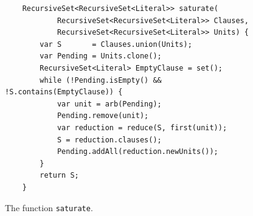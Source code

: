 \begin{figure}[!ht]
  \centering
\begin{verbatim}
    RecursiveSet<RecursiveSet<Literal>> saturate(
            RecursiveSet<RecursiveSet<Literal>> Clauses,
            RecursiveSet<RecursiveSet<Literal>> Units) {
        var S       = Clauses.union(Units);
        var Pending = Units.clone();
        RecursiveSet<Literal> EmptyClause = set();
        while (!Pending.isEmpty() && !S.contains(EmptyClause)) {
            var unit = arb(Pending);
            Pending.remove(unit);
            var reduction = reduce(S, first(unit));
            S = reduction.clauses();
            Pending.addAll(reduction.newUnits());
        }
        return S;
    }
\end{verbatim}
\vspace*{-0.3cm}
  \caption{The function \texttt{saturate}. }
  \label{fig:saturate}
\end{figure}
